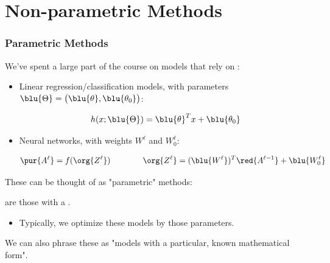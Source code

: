 \setcounter{chapter}{9-1} %

\chapter{Non-parametric Methods}

    \subsection{Parametric Methods}

        We've spent a large part of the course on models that rely on :
    
        \begin{itemize}
            \item Linear regression/classification models, with parameters $\blu{\Theta} = \big( \blu{\theta}, \blu{\theta_0} \big)$:
    
            \begin{equation}
                h(x; \blu{\Theta}) = \blu{\theta}^Tx + \blu{\theta_0}
            \end{equation}
    
            \item Neural networks, with weights $W^\ell$ and $W^\ell_0$:
    
            \begin{equation}
                \pur{A^\ell} = f(\org{Z^\ell})
                \qquad \qquad 
                \org{Z^\ell} =
                    (\blu{W^\ell})^T \red{A^{\ell-1}} + \blu{W_0^\ell} 
            \end{equation}
        \end{itemize}
    
        These can be thought of as "parametric" methods:\\
    
        \begin{definition}
             are those with a .
    
            \begin{itemize}
                \item Typically, we optimize these models by  those parameters.
            \end{itemize}
    
            We can also phrase these as "models with a particular, known mathematical form".
        \end{definition}
    
